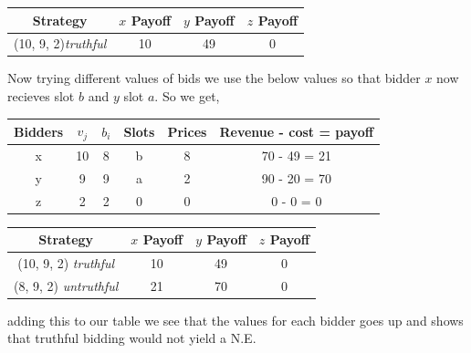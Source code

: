\documentclass[11pt]{article}
\begin{document}
{\begin{enumerate}
	\begin{center}
		\begin{tabular}{ |c|c|c|c|} 
			 \hline
			 Strategy & $x$ Payoff & $y$ Payoff & $z$ Payoff \\ 
			 \hline\hline
			 (10, 9, 2)\quad \textit{truthful} & 10 & 49 & 0 \\ 
	 		\hline
		\end{tabular}
	\end{center}
Now trying different values of bids we use the below values so that bidder $x$ now recieves slot $b$ and $y$ slot $a$.  So we get,
	\begin{center}
		\begin{tabular}{ |c|c|c|c|c|c| } 
			\hline
			Bidders & 	$v_j$ 	& 	$b_i$ 	& 	Slots 	& 	Prices 	&  Revenue - cost = payoff \\
			\hline \hline
			x 	  & 	10 	& 	8 	& 	b 	& 	8 	&  70 - 49 = 21\\
			\hline
			y 	  & 	9 	& 	9 	& 	a 	& 	2 	& 90 - 20 = 70 \\
			\hline
			z 	  & 	2 	& 	2 	& 	0	& 	0 	&  0 - 0 = 0 \\
			\hline
		\end{tabular}
	\end{center}
	\begin{center}
		\begin{tabular}{ |c|c|c|c|} 
			 \hline
			 Strategy & $x$ Payoff & $y$ Payoff & $z$ Payoff \\ 
			 \hline\hline
			 (10, 9, 2) \quad \textit{truthful} & 10 & 49 & 0\\ 
	 		\hline
			 (8, 9, 2) \quad \textit{untruthful} & 21 & 70 & 0\\ 
	 		\hline
		\end{tabular}
	\end{center}
	adding this to our table we see that the values for each bidder goes up and shows that truthful bidding would not yield a N.E.  
\end{enumerate}
}
\end{document}

